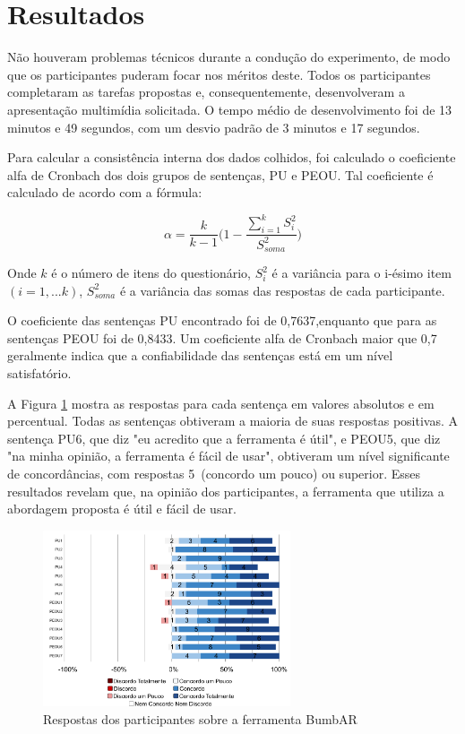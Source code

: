 \documentclass[../main.tex]{subfiles}
\begin{document}
\section{Resultados}
\label{sec:resultados}

Não houveram problemas técnicos durante a condução do experimento, de modo que os participantes puderam focar nos méritos deste. Todos os participantes completaram as tarefas propostas e, consequentemente, desenvolveram a apresentação multimídia solicitada. O tempo médio de desenvolvimento foi de 13 minutos e 49 segundos, com um desvio padrão de 3 minutos e 17 segundos.

Para calcular a consistência interna dos dados colhidos, foi calculado o coeficiente alfa de Cronbach dos dois grupos de sentenças, PU e PEOU. Tal coeficiente é calculado de acordo com a fórmula:

\[\alpha = \frac{k}{k-1}\Bigg(1 - \frac{\sum_{i = 1}^{k}S_i^2}{S_{soma}^2}\Bigg)\]

Onde \(k\) é o número de itens do questionário, \(S_i^2\) é a variância para o i-ésimo item \((i=1,...k)\), \(S_{soma}^2\) é a variância das somas das respostas de cada participante.

O coeficiente das sentenças PU encontrado foi de 0,7637,enquanto que para as sentenças PEOU foi de 0,8433. Um coeficiente alfa de Cronbach maior que 0,7 geralmente indica que a confiabilidade das sentenças está em um nível satisfatório. 

A Figura \ref{fig:resultados} mostra as respostas para cada sentença em valores absolutos e em percentual. Todas as sentenças obtiveram a maioria de suas respostas positivas. A sentença PU6, que diz "eu acredito que a ferramenta é útil", e PEOU5, que diz "na minha opinião, a ferramenta é fácil de usar", obtiveram um nível significante de concordâncias, com respostas 5~(concordo um pouco) ou superior. Esses resultados revelam que, na opinião dos participantes, a ferramenta que utiliza a abordagem proposta é útil e fácil de usar.

\begin{figure}[ht!]
\centering
\includegraphics[width=0.65\textwidth]{IMG/Avaliacao/resultados_bumbar.png}
\caption{Respostas dos participantes sobre a ferramenta BumbAR}
\label{fig:resultados}
\end{figure}
\end{document}
